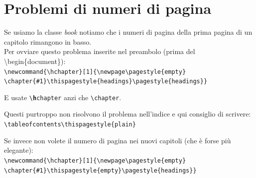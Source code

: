 \documentclass[a4paper,12pt]{article}
\begin{document}
\section{Problemi di numeri di pagina}
	Se usiamo la classe \emph{book} notiamo che i numeri di pagina della prima pagina di un capitolo rimangono in basso.\\
	Per ovviare questo problema inserite nel preambolo (prima del \textbackslash begin\{document\}):\\
	\texttt{\textbackslash newcommand\{\textbackslash hchapter\}[1]\{\textbackslash newpage\textbackslash pagestyle\{empty\}\\              \textbackslash chapter\{\#1\}\textbackslash thispagestyle\{headings\}\textbackslash pagestyle\{headings\}\}}\par
	E usate \texttt{\textbackslash \textbf{h}chapter} anzi che \verb!\chapter!.\par
	Questi purtroppo non risolvono il problema nell'indice e qui consiglio di scrivere:\\
	\verb!\tableofcontents\thispagestyle{plain}!~\par
	Se invece non volete il numero di pagina nei nuovi capitoli (che è forse più elegante): \\
	\texttt{\textbackslash newcommand\{\textbackslash hchapter\}[1]\{\textbackslash newpage\textbackslash pagestyle\{empty\}\\              \textbackslash chapter\{\#1\}\textbackslash thispagestyle\{empty\}\textbackslash pagestyle\{headings\}\}}
\end{document}
